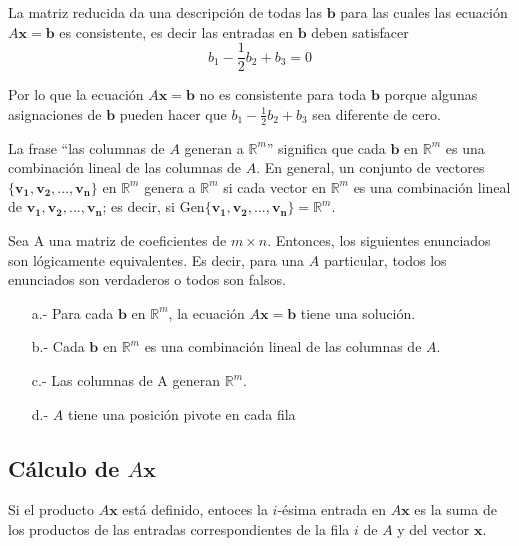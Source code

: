 \documentclass{article}
\begin{document}
La matriz reducida da una descripción de todas las $\mathbf{b}$ para las cuales las ecuación $A\mathbf{x} = \mathbf{b}$ es consistente, es decir las entradas en $\mathbf{b}$ deben satisfacer $$b_1 - \frac{1}{2}b_2 + b_3 = 0$$

Por lo que la ecuación $A\mathbf{x} = \mathbf{b}$ no es consistente para toda $\mathbf{b}$ porque algunas asignaciones de $\mathbf{b}$ pueden hacer que $b_1 - \frac{1}{2}b_2 + b_3$ sea diferente de cero. 

La frase “las columnas de $A$ generan a $\mathbb{R}^m$” significa que cada $\mathbf{b}$ en $\mathbb{R}^m$ es una combinación lineal de las columnas de $A$. En general, un conjunto de vectores $\{\mathbf{v_1}, \mathbf{v_2},..., \mathbf{v_n}\}$ en $\mathbb{R}^m$ genera a $\mathbb{R}^m$ si cada vector en $\mathbb{R}^m$ es una combinación lineal de $\mathbf{v_1}, \mathbf{v_2},..., \mathbf{v_n}$; es decir, si Gen$\{\mathbf{v_1}, \mathbf{v_2},..., \mathbf{v_n}\} = \mathbb{R}^m$.

\begin{tcolorbox}[colback=red!10!white, colframe=red!70!black, title=Las columnas de $A$ generan $\mathbb{R}^m$]
    Sea A una matriz de coeficientes de $m \times n$. Entonces, los siguientes enunciados son lógicamente equivalentes. Es decir, para una $A$ particular, todos los enunciados son verdaderos o todos son falsos.
    \begin{itemize}
        \item[a.-] Para cada $\mathbf{b}$ en $\mathbb{R}^m$, la ecuación $A\mathbf{x} = \mathbf{b}$ tiene una solución.
        \item[b.-] Cada $\mathbf{b}$ en $\mathbb{R}^m$ es una combinación lineal de las columnas de $A$.
        \item[c.-] Las columnas de A generan $\mathbb{R}^m$. 
        \item[d.-] $A$ tiene una posición pivote en cada fila 
    \end{itemize}
\end{tcolorbox}

\subsection*{Cálculo de $A\mathbf{x}$}

\begin{tcolorbox}[colback=green!20!white,colframe=green!80!black,title=Regla Fila-Vector para calcular $A\mathbf{x}$]
    Si el producto $A\mathbf{x}$ está definido, entoces la $i$-ésima entrada en $A\mathbf{x}$ es la suma de los productos de las entradas correspondientes de la fila $i$ de $A$ y del vector $\mathbf{x}$.
\end{tcolorbox}
\end{document}
